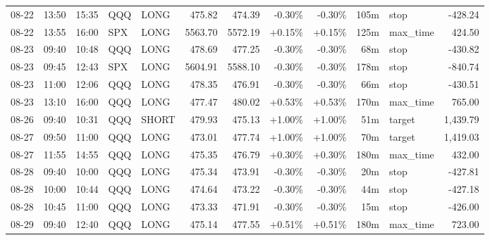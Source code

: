 \documentclass[11pt,a4paper,twoside]{article}
\begin{document}
\begin{center}
\begin{longtable}{>{\color{txtmain}}l l l l l r r r r r >{\color{txtmain}}l r}
08-22 & 13:50 & 15:35 & QQQ & LONG & 475.82 & 474.39 & \textcolor{lossred}{-0.30\%} & \textcolor{lossred}{-0.30\%} & 105m & stop & \textcolor{lossred}{-428.24} \\
08-22 & 13:55 & 16:00 & SPX & LONG & 5563.70 & 5572.19 & \textcolor{wingreen}{+0.15\%} & \textcolor{wingreen}{+0.15\%} & 125m & max\_time & \textcolor{wingreen}{424.50} \\
08-23 & 09:40 & 10:48 & QQQ & LONG & 478.69 & 477.25 & \textcolor{lossred}{-0.30\%} & \textcolor{lossred}{-0.30\%} & 68m & stop & \textcolor{lossred}{-430.82} \\
08-23 & 09:45 & 12:43 & SPX & LONG & 5604.91 & 5588.10 & \textcolor{lossred}{-0.30\%} & \textcolor{lossred}{-0.30\%} & 178m & stop & \textcolor{lossred}{-840.74} \\
08-23 & 11:00 & 12:06 & QQQ & LONG & 478.35 & 476.91 & \textcolor{lossred}{-0.30\%} & \textcolor{lossred}{-0.30\%} & 66m & stop & \textcolor{lossred}{-430.51} \\
08-23 & 13:10 & 16:00 & QQQ & LONG & 477.47 & 480.02 & \textcolor{wingreen}{+0.53\%} & \textcolor{wingreen}{+0.53\%} & 170m & max\_time & \textcolor{wingreen}{765.00} \\
08-26 & 09:40 & 10:31 & QQQ & SHORT & 479.93 & 475.13 & \textcolor{wingreen}{+1.00\%} & \textcolor{wingreen}{+1.00\%} & 51m & target & \textcolor{wingreen}{1,439.79} \\
08-27 & 09:50 & 11:00 & QQQ & LONG & 473.01 & 477.74 & \textcolor{wingreen}{+1.00\%} & \textcolor{wingreen}{+1.00\%} & 70m & target & \textcolor{wingreen}{1,419.03} \\
08-27 & 11:55 & 14:55 & QQQ & LONG & 475.35 & 476.79 & \textcolor{wingreen}{+0.30\%} & \textcolor{wingreen}{+0.30\%} & 180m & max\_time & \textcolor{wingreen}{432.00} \\
08-28 & 09:40 & 10:00 & QQQ & LONG & 475.34 & 473.91 & \textcolor{lossred}{-0.30\%} & \textcolor{lossred}{-0.30\%} & 20m & stop & \textcolor{lossred}{-427.81} \\
08-28 & 10:00 & 10:44 & QQQ & LONG & 474.64 & 473.22 & \textcolor{lossred}{-0.30\%} & \textcolor{lossred}{-0.30\%} & 44m & stop & \textcolor{lossred}{-427.18} \\
08-28 & 10:45 & 11:00 & QQQ & LONG & 473.33 & 471.91 & \textcolor{lossred}{-0.30\%} & \textcolor{lossred}{-0.30\%} & 15m & stop & \textcolor{lossred}{-426.00} \\
08-29 & 09:40 & 12:40 & QQQ & LONG & 475.14 & 477.55 & \textcolor{wingreen}{+0.51\%} & \textcolor{wingreen}{+0.51\%} & 180m & max\_time & \textcolor{wingreen}{723.00} \\

\end{longtable}
\end{center}
\end{document}
